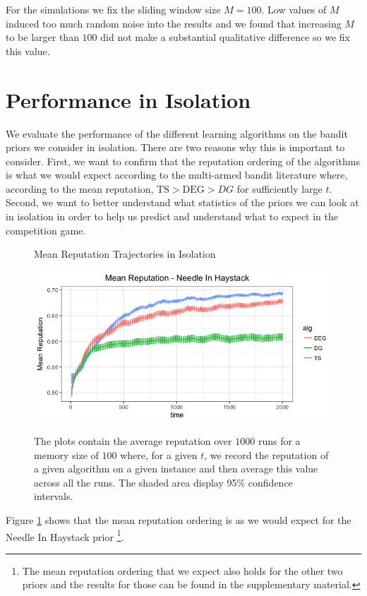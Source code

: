\documentclass[letterpaper]{article}
\theoremstyle{definition}
\newcommand{\TS}{\mathrm{TS}}
\newcommand{\DEG}{\mathrm{DEG}}
\begin{document}
For the simulations we fix the sliding window size $M = 100$. Low values of $M$ induced too much random noise into the results and we found that increasing $M$ to be larger than $100$ did not make a substantial qualitative difference so we fix this value.

\section{Performance in Isolation}\label{section:4}

We evaluate the performance of the different learning algorithms on the bandit priors we consider in isolation. There are two reasons why this is important to consider. First, we want to confirm that the reputation ordering of the algorithms is what we would expect according to the multi-armed bandit literature where, according to the mean reputation, $\TS > \DEG > DG$ for sufficiently large $t$. Second, we want to better understand what statistics of the priors we can look at in isolation in order to help us predict and understand what to expect in the competition game.

\begin{figure}
\caption{Mean Reputation Trajectories in Isolation}
\includegraphics[scale=0.35]{"figures/nih_iso_mean"}
\label{prelim_means}
\caption*{\tiny{The plots contain the average reputation over $1000$ runs for a memory size of $100$ where, for a given $t$, we record the reputation of a given algorithm on a given instance and then average this value across all the runs. The shaded area display 95\% confidence intervals.}}
\end{figure}

Figure \ref{prelim_means} shows that the mean reputation ordering is as we would expect for the Needle In Haystack prior \footnote{The mean reputation ordering that we expect also holds for the other two priors and the results for those can be found in the supplementary material.}.
\end{document}
